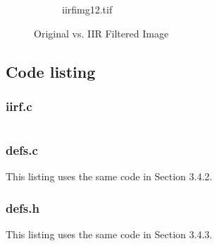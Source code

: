 \documentclass{article}
\begin{document}
\begin{figure}[ht]
\begin{subfigure}{0.5\textwidth}
\caption{iirfimg12.tif}
\end{subfigure}
\caption{Original vs. IIR Filtered Image}
\end{figure}

\subsection{Code listing}
\subsubsection{iirf.c}

\inputminted[tabsize=4]{c}{iirf.c}
\subsubsection{defs.c}
This listing uses the same code in Section 3.4.2.
\subsubsection{defs.h}
This listing uses the same code in Section 3.4.3.
\end{document}
